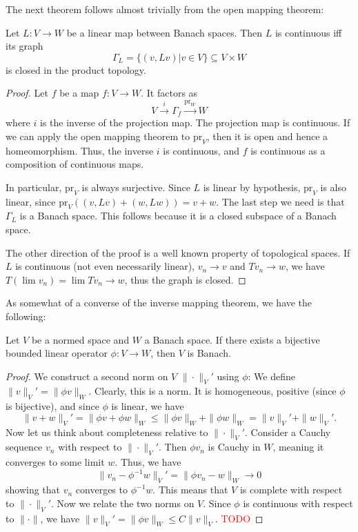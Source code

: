 \documentclass[twoside,symmetric, openany, 12pt]{./tuftebook}
\theoremstyle{definition}
\theoremstyle{definition}
\theoremstyle{definition}
\begin{document}
The next theorem follows almost trivially from the open mapping theorem:
\begin{Theorem}
	Let $L:V\to W$ be a linear map between Banach spaces. Then $L$ is continuous iff its graph
	\[\Gamma_L=\{(v, Lv)|v\in V\}\subseteq V\times W\]
	is closed in the product topology. 
\end{Theorem}
\begin{proof}
	Let $f$ be a map $f:V\to W$. It factors as
	\[V \xrightarrow{i} \Gamma_f \xrightarrow{\text{pr}_W} W\]
	where $i$ is the inverse of the projection map. The projection map is continuous. If we can apply the open mapping theorem to $\text{pr}_V$, then it is open and hence a homeomorphism. Thus, the inverse $i$ is continuous, and $f$ is continuous as a composition of continuous maps. 
	
	In particular, $\text{pr}_V$ is always surjective. Since $L$ is linear by hypothesis, $\text{pr}_V$ is also linear, since $\text{pr}_V((v, Lv) + (w, Lw)) = v + w$. The last step we need is that $\Gamma_L$ is a Banach space. This follows because it is a closed subspace of a Banach space.
	
	The other direction of the proof is a well known property of topological spaces. If $L$ is continuous (not even necessarily linear), $v_n \to v$ and $Tv_n \to w$, we have $T (\lim v_n)= \lim Tv_n \to w$, thus the graph is closed. 
\end{proof}
As somewhat of a converse of the inverse mapping theorem, we have the following:
\begin{Theorem}
	Let $V$ be a normed space and $W$ a Banach space. If there exists a bijective bounded linear operator $\phi:V \to W$, then $V$ is Banach.
\end{Theorem}
\begin{proof}
	We construct a second norm on $V$ $\|\cdot \|_V'$ using $\phi$: We define $\|v\|_V'=\|\phi v\|_W$. Clearly, this is a norm. It is homogeneous, positive (since $\phi$ is bijective), and since $\phi$ is linear, we have
	\[\|v + w\|_V' = \|\phi v + \phi w\|_W \le \|\phi v\|_W + \|\phi w\|_W = \|v\|_V' + \|w\|_V'.\]
	Now let us think about completeness relative to $\|\cdot \|_V'$. Consider a Cauchy sequence $v_n$ with respect to $\|\cdot\|_V'$. Then $\phi v_n$ is Cauchy in $W$, meaning it converges to some limit $w$. Thus, we have
	\[\|v_n - \phi^{-1}w\|_V' = \|\phi v_n - w\|_W \to 0\]
	showing that $v_n$ converges to $\phi^{-1}w$. This means that $V$ is complete with respect to $\|\cdot\|_V'$. Now we relate the two norms on $V$. Since $\phi$ is continuous with respect to $\|\cdot\|$, we have $\|v\|_V' = \|\phi v\|_W \le  C\|v\|_V$. \textcolor{red}{TODO}
\end{proof}
\end{document}
